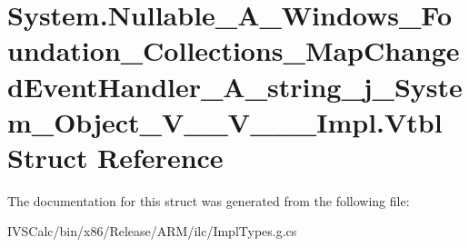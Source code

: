 \hypertarget{struct_system_1_1_nullable___a___windows___foundation___collections___map_changed_event_handler_23f1544cf88cd76cda7e05b73d65210c}{}\section{System.\+Nullable\+\_\+\+A\+\_\+\+Windows\+\_\+\+Foundation\+\_\+\+Collections\+\_\+\+Map\+Changed\+Event\+Handler\+\_\+\+A\+\_\+string\+\_\+j\+\_\+\+System\+\_\+\+Object\+\_\+\+V\+\_\+\+\_\+\+V\+\_\+\+\_\+\+\_\+\+Impl.\+Vtbl Struct Reference}
\label{struct_system_1_1_nullable___a___windows___foundation___collections___map_changed_event_handler_23f1544cf88cd76cda7e05b73d65210c}


The documentation for this struct was generated from the following file\+:\begin{DoxyCompactItemize}
\item 
I\+V\+S\+Calc/bin/x86/\+Release/\+A\+R\+M/ilc/Impl\+Types.\+g.\+cs\end{DoxyCompactItemize}

